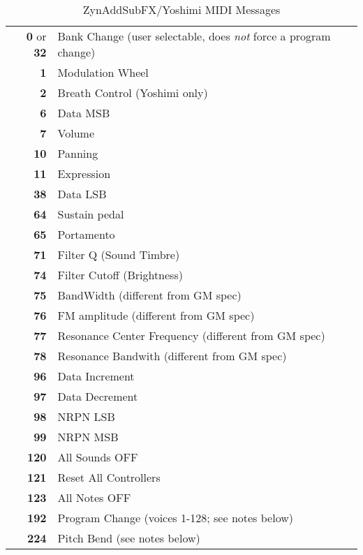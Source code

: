    \begin{table}
      \centering
      \caption{ZynAddSubFX/Yoshimi MIDI Messages}
      \label{table:zynaddsubfx_midi_messages}
      \begin{tabular}{r l}
         \textbf{0} or \textbf{32} &
            Bank Change (user selectable, does \textsl{not} force a program
            change) \\
         \textbf{1} & Modulation Wheel \\
         \textbf{2} & Breath Control (Yoshimi only)\\
         \textbf{6} & Data MSB \\
         \textbf{7} & Volume \\
         \textbf{10} & Panning \\
         \textbf{11} & Expression \\
         \textbf{38} & Data LSB \\
         \textbf{64} & Sustain pedal \\
         \textbf{65} & Portamento \\
         \textbf{71} & Filter Q (Sound Timbre) \\
         \textbf{74} & Filter Cutoff (Brightness) \\
         \textbf{75} & BandWidth (different from GM spec) \\
         \textbf{76} & FM amplitude (different from GM spec) \\
         \textbf{77} & Resonance Center Frequency (different from GM spec) \\
         \textbf{78} & Resonance Bandwith (different from GM spec) \\
         \textbf{96} & Data Increment \\
         \textbf{97} & Data Decrement \\
         \textbf{98} & NRPN LSB \\
         \textbf{99} & NRPN MSB \\
         \textbf{120} & All Sounds OFF \\
         \textbf{121} & Reset All Controllers \\
         \textbf{123} & All Notes OFF \\
         \textbf{192} & Program Change (voices 1-128; see notes below) \\
         \textbf{224} & Pitch Bend (see notes below) \\
      \end{tabular}
   \end{table}


